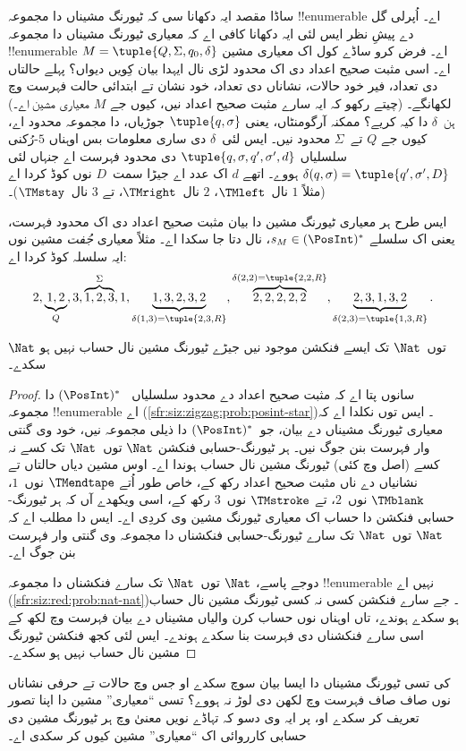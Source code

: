 \documentclass[../../../include/open-logic-section]{subfiles}
\begin{document}
\begin{explain}
ساڈا مقصد ایہ دکھانا سی کہ ٹیورنگ مشیناں دا مجموعہ
!!{enumerable} اے۔ اُپرلی گل دے پیشِ نظر ایس لئی ایہ
دکھانا کافی اے کہ معیاری ٹیورنگ مشیناں دا مجموعہ
!!{enumerable} اے۔ فرض کرو ساڈے کول اک معیاری مشین
$M = \tuple{Q, \Sigma, q_0, \delta}$ اے۔ اسی مثبت صحیح
اعداد دی اک محدود لڑی نال ایہدا بیان کِویں دیواں؟ پہلے
حالتاں دی تعداد، فیر خود حالات، نشاناں دی تعداد، خود نشان
تے ابتدائی حالت فہرست وچ لکھانگے۔ (چیتے رکھو کہ ایہ
سارے مثبت صحیح اعداد نیں، کیوں جے $M$ معیاری مشین اے۔)
ہن~$\delta$ دا کیہ کریے؟ ممکنہ آرگومنٹاں، یعنی
$\tuple{q,\sigma}$ جوڑیاں، دا مجموعہ محدود اے، کیوں جے
$Q$ تے~$\Sigma$ محدود نیں۔ ایس لئی~$\delta$ دی ساری
معلومات بس اوہناں $5$-رُکنی سلسلیاں
$\tuple{q, \sigma, q', \sigma', d}$ دی محدود فہرست اے
جنہاں لئی $\delta(q,\sigma) = \tuple{q', \sigma', D}$
ہووے۔ اتھے $d$ اک عدد اے جیڑا سمت~$D$ نوں کوڈ کردا
اے (مثلاً $1$ نال~$\TMleft$، $2$ نال~$\TMright$، تے
$3$ نال~$\TMstay$)۔

ایس طرح ہر معیاری ٹیورنگ مشین دا بیان مثبت صحیح اعداد دی
اک محدود فہرست، یعنی اک سلسلے $s_M \in
(\PosInt)^*$، نال دتا جا سکدا اے۔ مثلاً معیاری
\emph{جُفت} مشین نوں ایہ سلسلہ کوڈ کردا اے:
\[
2, \underbrace{1, 2}_Q, 3, \overbrace{1, 2, 3}^\Sigma, 1, \underbrace{1, 3, 2, 3, 2}_{\delta(1,3) = \tuple{2,3,R}}, 
\overbrace{2, 2, 2, 2, 2}^{\delta(2,2) = \tuple{2,2,R}},
\underbrace{2, 3, 1, 3, 2}_{\delta(2,3) = \tuple{1,3,R}}.
\]
\end{explain}

\begin{thm}
$\Nat$ توں~$\Nat$ تک ایسے فنکشن موجود نیں جیڑے ٹیورنگ
مشین نال حساب نہیں ہو سکدے۔
\end{thm}

\begin{proof}
سانوں پتا اے کہ مثبت صحیح اعداد دے محدود سلسلیاں
~$(\PosInt)^*$ دا مجموعہ !!{enumerable} اے
(\cref{sfr:siz:zigzag:prob:posint-star})۔ ایس توں نکلدا
اے کہ معیاری ٹیورنگ مشیناں دے بیان، جو~$(\PosInt)^*$
دا ذیلی مجموعہ نیں، خود وی گنتی وار فہرست بنن جوگ نیں۔
ہر ٹیورنگ-حسابی فنکشن $\Nat$ توں~$\Nat$ تک کسے نہ
کسے (اصل وچ کئی) ٹیورنگ مشین نال حساب ہوندا اے۔ اوس
مشین دیاں حالتاں تے نشانیاں دے ناں مثبت صحیح اعداد
رکھ کے، خاص طور اُتے $\TMendtape$ نوں~$1$، $\TMblank$
نوں~$2$، تے $\TMstroke$ نوں~$3$ رکھ کے، اسی ویکھدے آں
کہ ہر ٹیورنگ-حسابی فنکشن دا حساب اک معیاری ٹیورنگ مشین
وی کردِی اے۔ ایس دا مطلب اے کہ $\Nat$ توں~$\Nat$ تک
سارے ٹیورنگ-حسابی فنکشناں دا مجموعہ وی گنتی وار فہرست
بنن جوگ اے۔

دوجے پاسے، $\Nat$ توں~$\Nat$ تک سارے فنکشناں دا
مجموعہ !!{enumerable} نہیں اے
(\cref{sfr:siz:red:prob:nat-nat})۔ جے سارے فنکشن
کسی نہ کسی ٹیورنگ مشین نال حساب ہو سکدے ہوندے، تاں
اوہناں نوں حساب کرن والیاں مشیناں دے بیان فہرست وچ
لکھ کے اسی سارے فنکشناں دی فہرست بنا سکدے ہوندے۔
ایس لئی کجھ فنکشن ٹیورنگ مشین نال حساب نہیں ہو سکدے۔
\end{proof}

\begin{prob}
  کی تسی ٹیورنگ مشیناں دا ایسا بیان سوچ سکدے او جس وچ
  حالات تے حرفی نشاناں نوں صاف صاف فہرست وچ لکھن
  دی لوڑ نہ ہووے؟ تسی “معیاری” مشین دا اپنا تصور
  تعریف کر سکدے او، پر ایہ وی دسو کہ تہاڈے نویں معنیٰ
  وچ ہر ٹیورنگ مشین دی حسابی کارروائی اک “معیاری”
  مشین کیوں کر سکدی اے۔
\end{prob}
\end{document}
